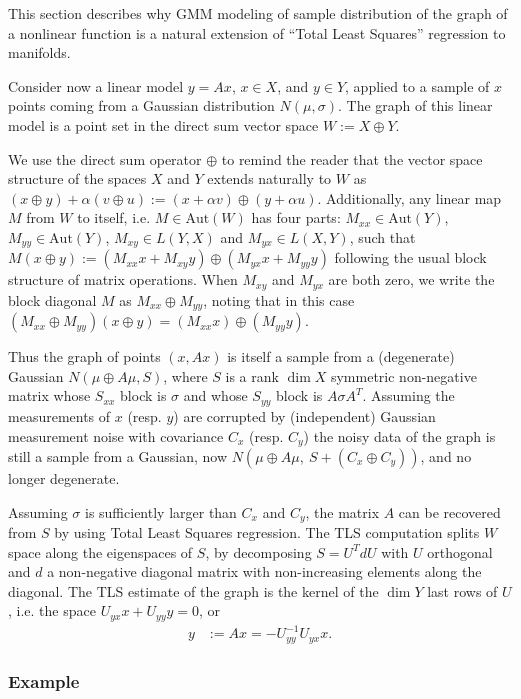 \documentclass[conference]{IEEEtran}
\begin{document}
This section describes why GMM modeling of sample distribution of the graph of a nonlinear function is a natural extension of ``Total Least Squares'' regression to manifolds.

Consider now a linear model $y = A x$, $x \in X$, and $y \in Y$, applied to a sample of $x$ points coming from a Gaussian distribution $N(\mu,\sigma)$.
The graph of this linear model is a point set in the direct sum vector space $W := X \oplus Y$.

\newcommand{\Aut}{\text{Aut}}
We use the direct sum operator $\oplus$ to remind the reader that the vector space structure of the spaces $X$ and $Y$ extends naturally to $W$ as $(x \oplus y) + \alpha (v \oplus u) := (x +\alpha v) \oplus (y + \alpha u)$.
Additionally, any linear map $M$ from $W$ to itself, i.e. $M\in\Aut(W)$ has four parts: $M_{xx} \in\Aut(Y)$, $M_{yy}\in\Aut(Y)$, $M_{xy}\in L(Y,X)$ and $M_{yx} \in L(X,Y)$, such that $M (x \oplus y) := (M_{xx} x + M_{xy} y) \oplus (M_{yx} x + M_{yy} y)$ following the usual block structure of matrix operations.
When $M_{xy}$ and $M_{yx}$ are both zero, we write the block diagonal $M$ as $M_{xx} \oplus M_{yy}$, noting that in this case $(M_{xx} \oplus M_{yy}) (x \oplus y) = (M_{xx} x) \oplus (M_{yy} y)$.

Thus the graph of points $(x,Ax)$ is itself a sample from a (degenerate) Gaussian $N( \mu \oplus A \mu, S)$, where $S$ is a rank $\dim X$ symmetric non-negative matrix whose $S_{xx}$ block is $\sigma$ and whose $S_{yy}$ block is $A \sigma A^T$.
Assuming the measurements of $x$ (resp. $y$) are corrupted by (independent) Gaussian measurement noise with covariance $C_x$ (resp. $C_y$) the noisy data of the graph is still a sample from a Gaussian, now $N( \mu \oplus A \mu,~ S+(C_x \oplus C_y))$, and no longer degenerate. 

Assuming $\sigma$ is sufficiently larger than $C_x$ and $C_y$, the matrix $A$ can be recovered from $S$ by using Total Least Squares regression.
The TLS computation splits $W$ space along the eigenspaces of $S$, by decomposing $S = U^T d U$ with $U$ orthogonal and $d$ a non-negative diagonal matrix with non-increasing elements along the diagonal.
The TLS estimate of the graph is the kernel of the $\dim Y$ last rows of $U$, i.e. the space $U_{yx} x + U_{yy} y = 0$, or 
\begin{align}
  y &:= A x = - U_{yy}^{-1} U_{yx} x. \label{eqn:TLS}
\end{align}

\subsubsection{Example}
\end{document}
